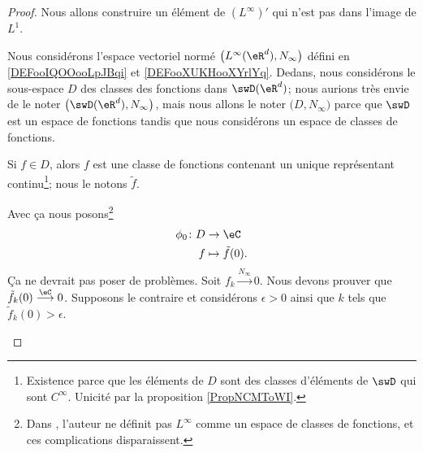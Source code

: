 \begin{proof}
	Nous allons construire un élément de \( (L^{\infty})'\) qui n'est pas dans l'image de \( L^1\).

	\begin{subproof}
		Nous considérons l'espace vectoriel normé \( \big( L^{\infty}(\eR^d), N_{\infty} \big)\) défini en \ref{DEFooIQOOooLpJBqi} et \ref{DEFooXUKHooXYrlYq}. Dedans, nous considérons le sous-espace \( D\) des classes des fonctions dans \( \swD(\eR^d)\); nous aurions très envie de le noter \( \big( \swD(\eR^d), N_{\infty} \big)\), mais nous allons le noter \( \big( D,N_{\infty} \big)\) parce que \( \swD\) est un espace de fonctions tandis que nous considérons un espace de classes de fonctions.

		Si \( f\in D\), alors \( f\) est une classe de fonctions contenant un unique représentant continu\footnote{Existence parce que les éléments de \( D\) sont des classes d'éléments de \( \swD\) qui sont \(  C^{\infty}\). Unicité par la proposition \ref{PropNCMToWI}.}; nous le notons \( \tilde f\).


		Avec ça nous posons\footnote{Dans \cite{BIBooFDGQooYferue}, l'auteur ne définit pas \( L^{\infty}\) comme un espace de classes de fonctions, et ces complications disparaissent.}
		\begin{equation}
			\begin{aligned}
				\phi_0\colon D & \to \eC              \\
				f              & \mapsto \tilde f(0).
			\end{aligned}
		\end{equation}
		Ça ne devrait pas poser de problèmes.
		Soit \( f_k\stackrel{N_{\infty}}{\longrightarrow}0\). Nous devons prouver que \( \tilde f_k(0)\stackrel{\eC}{\longrightarrow}0\). Supposons le contraire et considérons \( \epsilon>0\) ainsi que \( k\) tels que \( \tilde f_k(0)>\epsilon\).


\end{subproof}
\end{proof}
